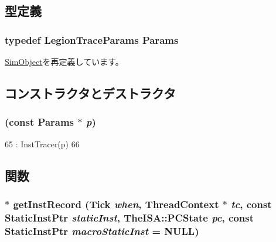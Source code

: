 \subsection{型定義}
\hypertarget{classTrace_1_1LegionTrace_ac9d15a61af503a8c154a6dc072dd2b3b}{
\subsubsection[{Params}]{\setlength{\rightskip}{0pt plus 5cm}typedef LegionTraceParams {\bf Params}}}
\label{classTrace_1_1LegionTrace_ac9d15a61af503a8c154a6dc072dd2b3b}


\hyperlink{classSimObject_a0f0761d2db586a23bb2a2880b8f387bb}{SimObject}を再定義しています。

\subsection{コンストラクタとデストラクタ}
\hypertarget{classTrace_1_1LegionTrace_af0e4932042e6f5323bff3cef8f36e126}{
\subsubsection[{LegionTrace}]{ (const {\bf Params} $\ast$ {\em p})}}
\label{classTrace_1_1LegionTrace_af0e4932042e6f5323bff3cef8f36e126}



\begin{DoxyCode}
65                                  : InstTracer(p)
66     {}
\end{DoxyCode}


\subsection{関数}
\hypertarget{classTrace_1_1LegionTrace_a1c7bdae6744541417139f6c6353fd76f}{
\subsubsection[{getInstRecord}]{$\ast$ getInstRecord ({\bf Tick} {\em when}, \/  {\bf ThreadContext} $\ast$ {\em tc}, \/  const {\bf StaticInstPtr} {\em staticInst}, \/  TheISA::PCState {\em pc}, \/  const {\bf StaticInstPtr} {\em macroStaticInst} = {\ttfamily NULL})}}
\label{classTrace_1_1LegionTrace_a1c7bdae6744541417139f6c6353fd76f}


